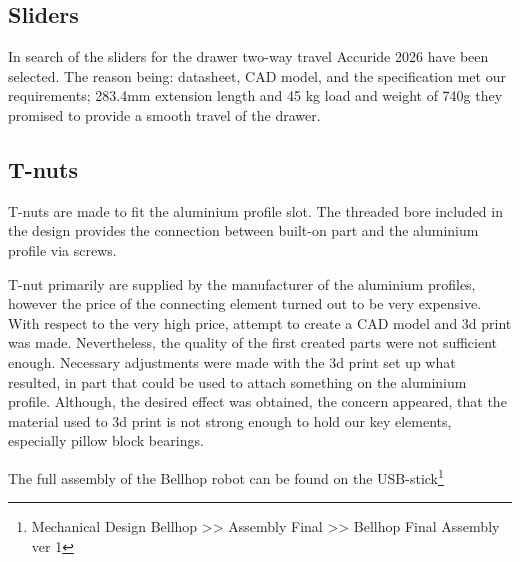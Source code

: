 \documentclass[11pt]{article}
\begin{document}
\subsection*{Sliders}
In search of the sliders for the drawer two-way travel Accuride 2026 have been selected. The reason being: datasheet, CAD model, and the specification met our requirements; 283.4mm extension length and 45 kg load and weight of 740g they promised to provide a smooth travel of the drawer.


\subsection*{T-nuts}
T-nuts are made to fit the aluminium profile slot. The threaded bore included in the design provides the connection between built-on part and the aluminium profile via screws.


T-nut primarily are supplied by the manufacturer of the aluminium profiles, however the price of the connecting element turned out to be very expensive. With respect to the very high price, attempt to create a CAD model and 3d print was made. Nevertheless, the quality of the first created parts were not sufficient enough. Necessary adjustments were made with the 3d print set up what resulted, in part that could be used to attach something on the aluminium profile. Although, the desired effect was obtained, the concern appeared, that the material used to 3d print is not strong enough to hold our key elements, especially pillow block bearings.

The full assembly of the Bellhop robot can be found on the USB-stick\footnote{ 
Mechanical Design Bellhop >> Assembly Final >> Bellhop Final Assembly ver 1}
\end{document}

